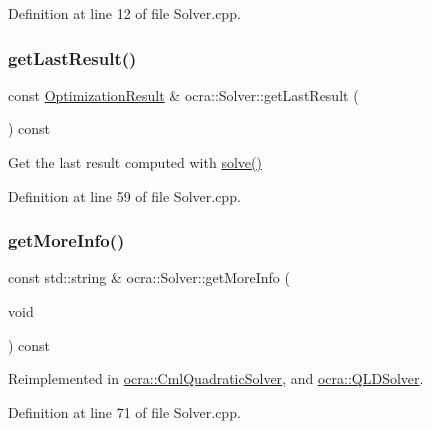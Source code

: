 Definition at line 12 of file Solver.\+cpp.

\hypertarget{classocra_1_1Solver_a4d21fa5cd2e0ed8b9418556a0f0b1b92}{}\label{classocra_1_1Solver_a4d21fa5cd2e0ed8b9418556a0f0b1b92} 
\subsubsection{\texorpdfstring{get\+Last\+Result()}{getLastResult()}}
{\footnotesize\ttfamily const \hyperlink{structocra_1_1OptimizationResult}{Optimization\+Result} \& ocra\+::\+Solver\+::get\+Last\+Result (\begin{DoxyParamCaption}{ }\end{DoxyParamCaption}) const}

Get the last result computed with \hyperlink{classocra_1_1Solver_a86151fea09399da16d6ce47abb1ba904}{solve()} 

Definition at line 59 of file Solver.\+cpp.

\hypertarget{classocra_1_1Solver_a3ebcf70ad5466cd31f27811ad6ccdfff}{}\label{classocra_1_1Solver_a3ebcf70ad5466cd31f27811ad6ccdfff} 
\subsubsection{\texorpdfstring{get\+More\+Info()}{getMoreInfo()}}
{\footnotesize\ttfamily const std\+::string \& ocra\+::\+Solver\+::get\+More\+Info (\begin{DoxyParamCaption}\item[{void}]{ }\end{DoxyParamCaption}) const\hspace{0.3cm}{\ttfamily [virtual]}}



Reimplemented in \hyperlink{classocra_1_1CmlQuadraticSolver_a95f1b52f24a43f9afc38b36fb7943e05}{ocra\+::\+Cml\+Quadratic\+Solver}, and \hyperlink{classocra_1_1QLDSolver_a387f7b02e2cac27c91a0e36c2b473722}{ocra\+::\+Q\+L\+D\+Solver}.



Definition at line 71 of file Solver.\+cpp.

\hypertarget{classocra_1_1Solver_ad80a950db015620c2eb43cbaab5ca51f}{}\label{classocra_1_1Solver_ad80a950db015620c2eb43cbaab5ca51f} 
